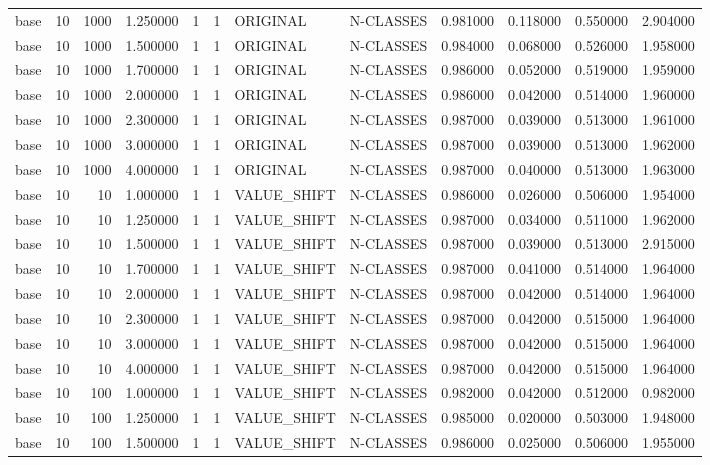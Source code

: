 \begin{tabular}{lrrrllllrrrr}
base & 10 & 1000 & 1.250000 & 1 & 1 & ORIGINAL & N-CLASSES & 0.981000 & 0.118000 & 0.550000 & 2.904000 \\
base & 10 & 1000 & 1.500000 & 1 & 1 & ORIGINAL & N-CLASSES & 0.984000 & 0.068000 & 0.526000 & 1.958000 \\
base & 10 & 1000 & 1.700000 & 1 & 1 & ORIGINAL & N-CLASSES & 0.986000 & 0.052000 & 0.519000 & 1.959000 \\
base & 10 & 1000 & 2.000000 & 1 & 1 & ORIGINAL & N-CLASSES & 0.986000 & 0.042000 & 0.514000 & 1.960000 \\
base & 10 & 1000 & 2.300000 & 1 & 1 & ORIGINAL & N-CLASSES & 0.987000 & 0.039000 & 0.513000 & 1.961000 \\
base & 10 & 1000 & 3.000000 & 1 & 1 & ORIGINAL & N-CLASSES & 0.987000 & 0.039000 & 0.513000 & 1.962000 \\
base & 10 & 1000 & 4.000000 & 1 & 1 & ORIGINAL & N-CLASSES & 0.987000 & 0.040000 & 0.513000 & 1.963000 \\
base & 10 & 10 & 1.000000 & 1 & 1 & VALUE_SHIFT & N-CLASSES & 0.986000 & 0.026000 & 0.506000 & 1.954000 \\
base & 10 & 10 & 1.250000 & 1 & 1 & VALUE_SHIFT & N-CLASSES & 0.987000 & 0.034000 & 0.511000 & 1.962000 \\
base & 10 & 10 & 1.500000 & 1 & 1 & VALUE_SHIFT & N-CLASSES & 0.987000 & 0.039000 & 0.513000 & 2.915000 \\
base & 10 & 10 & 1.700000 & 1 & 1 & VALUE_SHIFT & N-CLASSES & 0.987000 & 0.041000 & 0.514000 & 1.964000 \\
base & 10 & 10 & 2.000000 & 1 & 1 & VALUE_SHIFT & N-CLASSES & 0.987000 & 0.042000 & 0.514000 & 1.964000 \\
base & 10 & 10 & 2.300000 & 1 & 1 & VALUE_SHIFT & N-CLASSES & 0.987000 & 0.042000 & 0.515000 & 1.964000 \\
base & 10 & 10 & 3.000000 & 1 & 1 & VALUE_SHIFT & N-CLASSES & 0.987000 & 0.042000 & 0.515000 & 1.964000 \\
base & 10 & 10 & 4.000000 & 1 & 1 & VALUE_SHIFT & N-CLASSES & 0.987000 & 0.042000 & 0.515000 & 1.964000 \\
base & 10 & 100 & 1.000000 & 1 & 1 & VALUE_SHIFT & N-CLASSES & 0.982000 & 0.042000 & 0.512000 & 0.982000 \\
base & 10 & 100 & 1.250000 & 1 & 1 & VALUE_SHIFT & N-CLASSES & 0.985000 & 0.020000 & 0.503000 & 1.948000 \\
base & 10 & 100 & 1.500000 & 1 & 1 & VALUE_SHIFT & N-CLASSES & 0.986000 & 0.025000 & 0.506000 & 1.955000 \\

\end{tabular}
